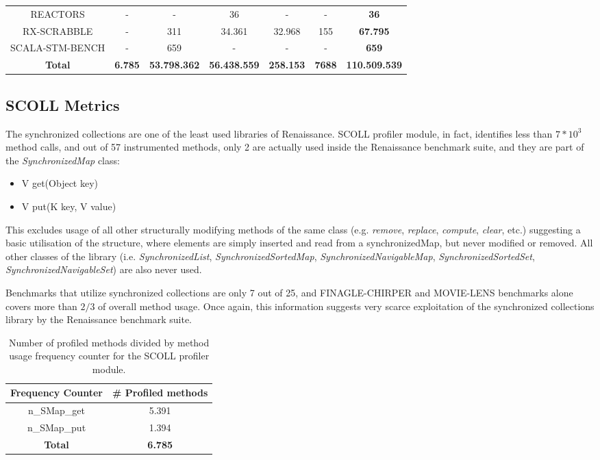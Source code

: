 \documentclass[]{usiinfthesis}
\begin{document}
\begin{table}
{\begin{tabular}{|c|c|c|c|c|c||c|}
REACTORS	&	 -   	&	 - 	&	 36 	&	 -   	&	 -   	&	 \textbf{36} 	 \\ 
RX-SCRABBLE	&	 -   	&	 311 	&	 34.361 	&	 32.968 	&	 155 	&	 \textbf{67.795} 	 \\ 
SCALA-STM-BENCH	&	 -   	&	 659 	&	 -   	&	 -   	&	 -   	&	 \textbf{659} 	 \\ 
\hline													
\hline													
\textbf{Total}	&  \textbf{	 6.785 	} &  \textbf{	 53.798.362 	} &  \textbf{	 56.438.559 	} &  \textbf{	 258.153 	} &  \textbf{	7688	} &  \textbf{	 110.509.539 	 }\\ 
\hline													
\end{tabular}
}
\end{table}%


\subsection{SCOLL Metrics}
The synchronized collections are one of the least used libraries of Renaissance. SCOLL profiler module, in fact, identifies less than \(7*10^3\) method calls, and out of 57 instrumented methods, only 2 are actually used inside the Renaissance benchmark suite, and they are part of the \textit{SynchronizedMap} class:
\begin{itemize}
    \item V get(Object key)
    \item V put(K key, V value)
\end{itemize}
 This excludes usage of all other structurally modifying methods of the same class (e.g. \textit{remove}, \textit{replace}, \textit{compute}, \textit{clear}, etc.) suggesting a basic utilisation of the structure, where elements are simply inserted and read from a synchronizedMap, but never modified or removed. All other classes of the library (i.e. \textit{SynchronizedList}, \textit{SynchronizedSortedMap}, \textit{SynchronizedNavigableMap}, \textit{SynchronizedSortedSet}, \textit{SynchronizedNavigableSet}) are also never used.
 
 Benchmarks that utilize synchronized collections are only 7 out of 25, and FINAGLE-CHIRPER and MOVIE-LENS benchmarks alone covers more than \(2/3\) of overall method usage. Once again, this information suggests very scarce exploitation of the synchronized collections library by the Renaissance benchmark suite.
 
 
\begin{table}
\centering
\caption{Number of profiled methods divided by method usage frequency counter for the SCOLL profiler module.}
\begin{tabular}{|c|c|}
\hline
\textbf{Frequency Counter} & \textbf{# Profiled methods} \\
\hline
n\_SMap\_get	&	5.391	 \\ 
n\_SMap\_put	&	1.394	 \\ 
\hline			
\hline			
\textbf{Total}	&  \textbf{	6.785	 }\\ 
\hline			
\end{tabular}
\end{table}%
\end{document}
